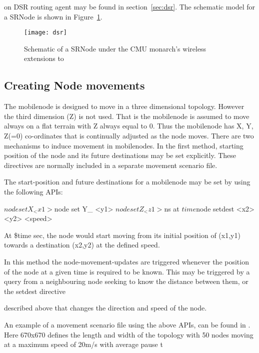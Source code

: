 on DSR routing agent may be found in section~\ref{sec:dsr}. The schematic model for a SRNode is shown in Figure~\ref{fig:mobilenode-dsr}.
\begin{figure}[tb]
    \centerline{\texttt{[image: dsr]}}
    \caption{Schematic of a SRNode under the CMU monarch's wireless extensions to \ns}
    \label{fig:mobilenode-dsr}
\end{figure}

\subsection{Creating Node movements}
\label{sec:mobilenode-movements}

The mobilenode is designed to move in a three dimensional topology. However the third dimension (Z) is not used. That is the mobilenode is assumed to move always on a flat terrain with Z always equal to 0.
Thus the mobilenode has X, Y, Z(=0) co-ordinates that is continually adjusted as the node moves. There are two mechanisms to induce movement in mobilenodes. 
In the first method, starting position of the node and its future destinations may be set explicitly. These directives are normally included in a separate movement scenario file. 

The start-position and future destinations for a mobilenode may be set by using the following APIs:

\begin{program}

$node set X_ <x1>
$node set Y_ <y1>
$node set Z_ <z1>

$ns at $time $node setdest <x2> <y2> <speed>
\end{program}
At \$time sec, the node would start moving from its initial position 
of (x1,y1) towards a destination (x2,y2) at the defined speed.

In this method the node-movement-updates are triggered whenever the position of the node at a given time is required to be known. This may be triggered by a query from a neighbouring node seeking to know the distance between them, or the setdest directive











 described above that changes the direction and speed of the node.

An example of a movement scenario file using the above APIs, can be found in . Here 670x670 defines the length and width of the topology with 50 nodes moving at a maximum speed of 20m/s with average pause t











